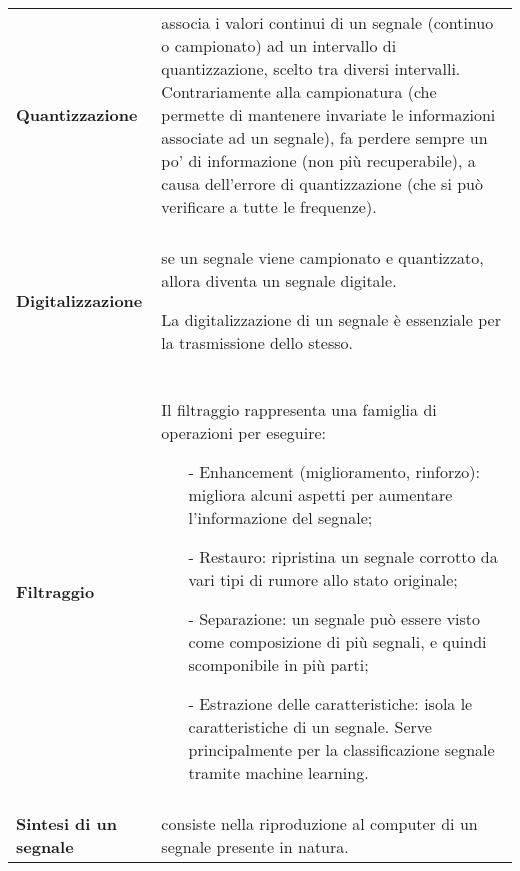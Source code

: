 \documentclass[a4paper, 10pt]{report}
\begin{document}
\begin{tabular}{lp{}}

\textbf{Quantizzazione} & associa i valori continui di un segnale (continuo o campionato) ad un intervallo di quantizzazione, scelto tra diversi intervalli.
 Contrariamente alla campionatura (che permette di mantenere invariate le informazioni associate ad un segnale), fa perdere sempre un po’ di informazione (non più recuperabile), a causa dell’errore di quantizzazione (che si può verificare a tutte le frequenze).\\\\

\textbf{Digitalizzazione} & se un segnale viene campionato e quantizzato, allora diventa un segnale digitale.

La digitalizzazione di un segnale è essenziale per la trasmissione dello stesso.\\\\

\textbf{Filtraggio} & Il filtraggio rappresenta una famiglia di operazioni per eseguire:
\begin{itemize}
\item[-] Enhancement (miglioramento, rinforzo): migliora alcuni aspetti per aumentare l’informazione del segnale;
\item[-] Restauro: ripristina un segnale corrotto da vari tipi di rumore allo stato originale;
\item[-] Separazione: un segnale può essere visto come composizione di più segnali, e quindi scomponibile in più parti;
\item[-] Estrazione delle caratteristiche: isola le caratteristiche di un segnale. Serve principalmente per la classificazione segnale tramite machine learning.
\end{itemize}

\\\\ \textbf{Sintesi di un segnale} & consiste nella riproduzione al computer di un segnale presente in natura.

\end{tabular}
\end{document}
